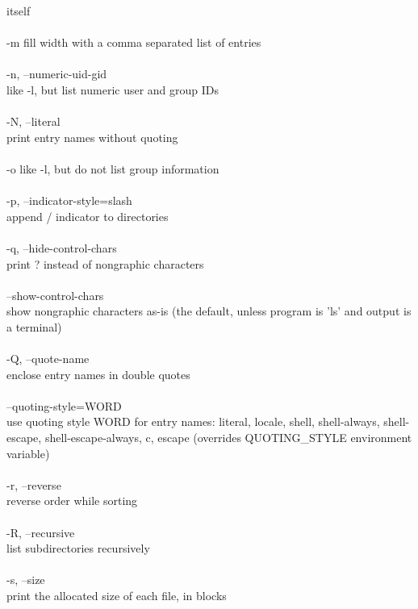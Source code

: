 \documentclass{article}
\begin{document}
              itself \\
\\
       -m     fill width with a comma separated list of entries \\
\\
       -n, --numeric-uid-gid \\
              like -l, but list numeric user and group IDs \\
\\
       -N, --literal \\
              print entry names without quoting \\
\\
       -o     like -l, but do not list group information \\
\\
       -p, --indicator-style=slash \\
              append / indicator to directories \\
\\
       -q, --hide-control-chars \\
              print ? instead of nongraphic characters \\
\\
       --show-control-chars \\
              show nongraphic characters as-is (the default, unless program is
              'ls' and output is a terminal) \\
\\
       -Q, --quote-name \\
              enclose entry names in double quotes \\
\\
       --quoting-style=WORD \\
              use  quoting style WORD for entry names: literal, locale, shell,
              shell-always,  shell-escape,  shell-escape-always,   c,   escape
              (overrides QUOTING_STYLE environment variable) \\
\\
       -r, --reverse \\
              reverse order while sorting \\
\\
       -R, --recursive \\
              list subdirectories recursively \\
\\
       -s, --size \\
              print the allocated size of each file, in blocks \\
\end{document}

